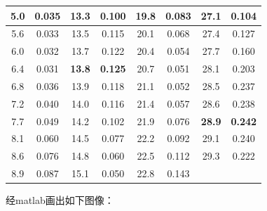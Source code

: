 \documentclass[12pt,a4paper,UTF8]{ctexart}
\begin{document}
\begin{table}[htbp]
{\begin{tabular}{|c|c||c|c||c|c||c|c|}
\hline
       5.0 &      0.035 &       13.3 &        0.100 &       19.8 &      0.083 &       27.1 &      0.104 \\
\hline
       5.6 &      0.033 &       13.5 &      0.115 &       20.1 &      0.068 &       27.4 &      0.127 \\
\hline
       6.0 &      0.032 &       13.7 &      0.122 &       20.4 &      0.054 &       27.7 &       0.160 \\
\hline
       6.4 &      0.031 &       \textbf{13.8} &      \textbf{0.125} &       20.7 &      0.051 &       28.1 &      0.203 \\
\hline
       6.8 &      0.036 &       13.9 &      0.118 &       21.1 &      0.052 &       28.5 &      0.237 \\
\hline
       7.2 &       0.040 &         14.0 &      0.116 &       21.4 &      0.057 &       28.6 &      0.238 \\
\hline
       7.7 &      0.049 &       14.2 &      0.102 &       21.9 &      0.076 &       \textbf{28.9} &      \textbf{0.242} \\
\hline
       8.1 &       0.060 &       14.5 &      0.077 &       22.2 &      0.092 &       29.1 &       0.240 \\
\hline
       8.6 &      0.076 &       14.8 &       0.060&       22.5 &      0.112 &       29.3 &      0.222 \\
\hline
       8.9 &      0.087 &       15.1 &       0.050 &       22.8 &      0.143 &            &            \\
\hline
\end{tabular} }
\end{table} 
\newpage
经matlab画出如下图像：
\begin{figure}[htb]
\end{figure}
\end{document}
